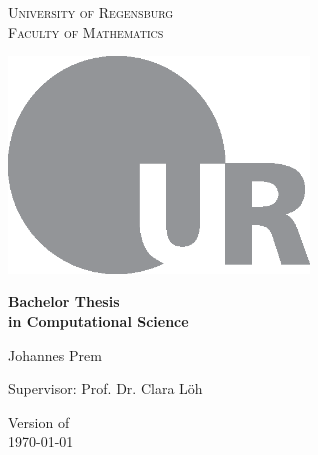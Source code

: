 \begin{titlepage}
    \begin{center}
    \scshape
        University of Regensburg\\
        Faculty of Mathematics
        
    \vspace{2cm}
    
        
    \vspace{2.5cm}
    
        \includegraphics[width=0.6\textwidth]{ur_logo.eps}
        
    \vspace{2cm}
    
        {\Large\bfseries%
            Bachelor Thesis\\
            in Computational Science}
        
    \vspace{1.3cm}
    
        Johannes Prem
        
    \vspace{0.4cm}
    
        Supervisor: Prof. Dr. Clara Löh
        
    \vfill
    
        {\footnotesize Version of}\\
        \today
    \end{center}
\end{titlepage}
